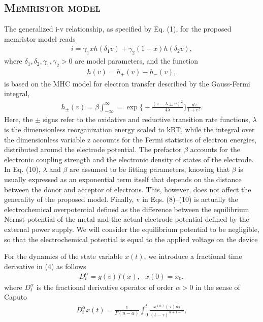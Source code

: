 \documentclass{article}
\begin{document}
{\begin{multicols}{2}
{\section{\scshape Memristor model}
}
The generalized i-v relationship, as specified by Eq. (1), for the proposed memristor model reads
\begin{align}
    i = \gamma _1 x h(\delta _1 v) + \gamma _2(1 - x) h (\delta _2 v),
\end{align}
where $\delta _1, \delta _2, \gamma _1, \gamma _2 > 0$ are model parameters, and the function
\begin{align}{}
    h (v) = h_+ (v) - h_- (v),
\end{align}
is based on the MHC model for electron transfer described by the Gauss-Fermi integral,
\begin{align}
    h_\pm (v) = \beta \int_{-\infty}^\infty = \exp{\biggl\{ -\frac{(z - \lambda \pm v)^2}{4 \lambda} \biggr\} } \frac{\,dz}{1+e^z}.
\end{align}
Here, the $\pm$ signs refer to the oxidative and reductive
transition rate functions, $\lambda$ is the dimensionless reorganization energy scaled to kBT, while the integral over the
dimensionless variable z accounts for the Fermi statistics of electron energies, distributed around the electrode
potential. The prefactor $\beta$ accounts for the electronic
coupling strength and the electronic density of states of
the electrode. In Eq. (10), $\lambda$ and $\beta$ are assumed to be
fitting parameters, knowing that $\beta$ is usually expressed
as an exponential term itself that depends on the distance between the donor and acceptor of electrons. This,
however, does not affect the generality of the proposed
model. Finally, v in Eqs. (8)–(10) is actually the electrochemical overpotential defined as the difference between
the equilibrium Nernst-potential of the metal and the
actual electrode potential defined by the external power
supply. We will consider the equilibrium potential to be
negligible, so that the electrochemical potential is equal
to the applied voltage on the device \par
For the dynamics of the state variable $x(t)$, we introduce a fractional time derivative in (4) as follows
\begin{align}
    D_t^\alpha = g(v)f(x), ~~~x(0) = x_0,
\end{align}
where $ D_t^\alpha$ is the fractional derivative operator of order
$\alpha > 0$ in the sense of Caputo
\begin{align}
    D_t^\alpha x(t) = \frac{1}{\Gamma (n-\alpha)} \int_0^t \frac{x^{(n)} (\tau)d \tau}{(t - \tau)^{\alpha+1-n}},

\end{align}
\end{multicols}}
\end{document}
